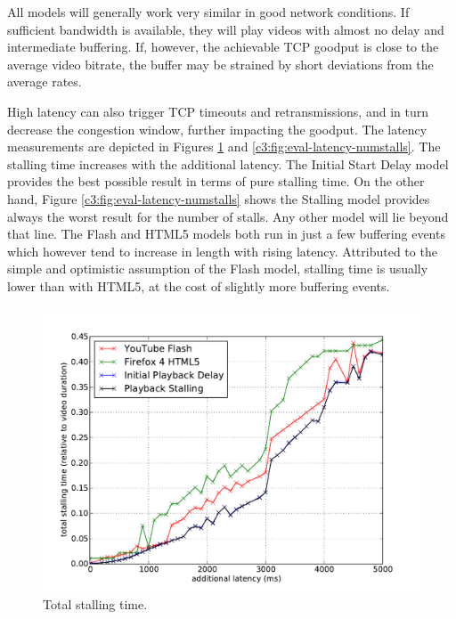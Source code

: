 All models will generally work very similar in good network conditions. If sufficient bandwidth is available, they will play videos with almost no delay and  intermediate buffering. If, however, the achievable TCP goodput is close to the average video bitrate, the buffer may be strained by short deviations from the average rates. %

High latency can also trigger TCP timeouts and retransmissions, and in turn decrease the congestion window, further impacting the goodput. The latency measurements are depicted in Figures \ref{c3:fig:eval-latency-stallingtime} and \ref{c3:fig:eval-latency-numstalls}. The stalling time increases with the additional latency. The Initial Start Delay model provides the best possible result in terms of pure stalling time. On the other hand, Figure \ref{c3:fig:eval-latency-numstalls} shows the Stalling model provides always the worst result for the number of stalls. Any other model will lie beyond that line. The Flash and HTML5 models both run in just a few buffering events which however tend to increase in length with rising latency. Attributed to the simple and optimistic assumption of the Flash model, stalling time is usually lower than with HTML5, at the cost of slightly more buffering events.
 

\begin{figure}[htb]
    \centering
    \includegraphics[width=\textwidth]{images/eval-latency-stallingtime.pdf}
    \caption{Total stalling time.}
    \label{c3:fig:eval-latency-stallingtime}
\end{figure}


